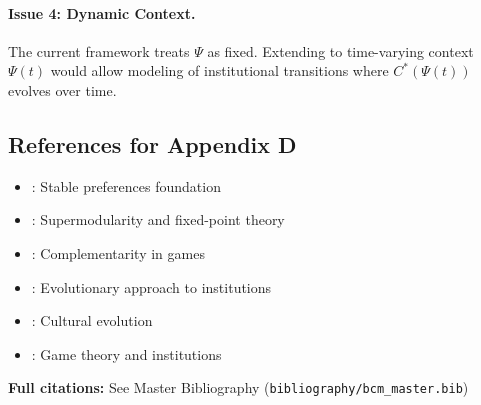 \paragraph{Issue 4: Dynamic Context.}
The current framework treats $\Psi$ as fixed. Extending to time-varying
context $\Psi(t)$ would allow modeling of institutional transitions
where $C^*(\Psi(t))$ evolves over time.


\subsection{References for Appendix D}
\label{sec:D-references}

\begin{itemize}[nosep]
    \item \citet{stiglerbecker1977}: Stable preferences foundation
    \item \citet{topkis1998}: Supermodularity and fixed-point theory
    \item \citet{milgromroberts1990compare}: Complementarity in games
    \item \citet{bowles2004}: Evolutionary approach to institutions
    \item \citet{boydricherson}: Cultural evolution
    \item \citet{gintis2007}: Game theory and institutions
\end{itemize}

\textbf{Full citations:} See Master Bibliography (\texttt{bibliography/bcm\_master.bib})


